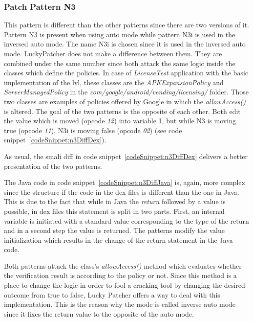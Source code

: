 \subsubsection{Patch Pattern N3}
This pattern is different than the other patterns since there are two versions of it.
Pattern N3 is present when using auto mode while pattern N3i is used in the inversed auto mode.
The name N3i is chosen since it is used in the inversed auto mode.
LuckyPatcher does not make a difference between them.
They are combined under the same number since both attack the same logic inside the classes which define the policies.
In case of \textit{LicenseTest}
 application with the basic implementation of the \gls{lvl}, these classes are the \textit{APKExpansionPolicy} and \textit{ServerManagedPolicy} in the  \textit{com/google/android/vending/licensing/} folder.
Those two classes are examples of policies offered by Google \cite{developersLicensingReference} in which the \textit{allowAccess()} is altered.
\newline
The goal of the two patterns is the opposite of each other.
Both edit the value which is moved (opcode \textit{12}) into variable 1, but while N3 is moving true (opcode \textit{11}), N3i is moving false (opcode \textit{02}) (see code snippet~\ref{codeSnippet:n3DiffDex}).
\newline

As usual, the smali diff in code snippet~\ref{codeSnippet:n3DiffDex} delivers a better presentation of the two patterns.
\newline

The Java code in code snippet~\ref{codeSnippet:n3DiffJava} is, again, more complex since the structure if the code in the \gls{dex} files is different than the one in Java.
This is due to the fact that while in Java the \textit{return} followed by a value is possible, in \gls{dex} files this statement is split in two parts.
First, an internal variable is initiated with a standard value corresponding to the type of the return and in a second step the value is returned.
The patterns modify the value initialization which results in the change of the return statement in the Java code.
\newline

Both patterns attack the class's \textit{allowAccess()} method which evaluates whether the verification result is according to the policy or not.
Since this method is a place to change the logic in order to fool a cracking tool by changing the desired outcome from true to false, Lucky Patcher offers a way to deal with this implementation.
This is the reason why the mode is called inverse auto mode since it fixes the return value to the opposite of the auto mode.


